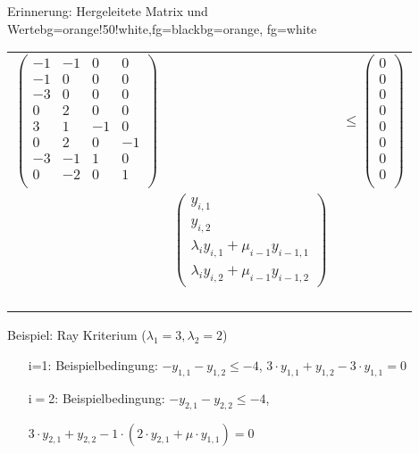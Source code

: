 \begin{frame}
	\begin{variableblock}{Erinnerung: Hergeleitete Matrix und Werte}{bg=orange!50!white,fg=black}{bg=orange, fg=white}
	\begin{tabular}{rll}
		\multirow{2}{*}{$\begin{pmatrix}
			-1 		& -1 		&  0		& 0		 \\
			-1 		& 0 		&  0		& 0		 \\
			-3 		& 0 		&  0		& 0		 \\
			0 		& 2 		&  0		& 0		 \\
			3 		& 1 		&  -1		& 0		 \\
			0 		& 2 		&  0		& -1	 \\
			-3 		& -1 		&  1		& 0		 \\
			0 		& -2 		&  0		& 1	 	 \\
			\end{pmatrix}$}& &\multirow{2}{*}{$ \le \begin{pmatrix}
			0 \\ 0 \\ 0 \\ 0 \\ 0 \\ 0 \\ 0 \\ 0 \\ 
			\end{pmatrix} $}\\
		& & \\
		& \multirow{2}{*}{$\begin{pmatrix}
			y_{i,1} \\ y_{i,2} \\ \lambda_iy_{i,1}+\mu_{i-1}y_{i-1,1} \\ \lambda_iy_{i,2}+\mu_{i-1}y_{i-1,2}
			\end{pmatrix} $} & \\
		& & \\
		& & \\
		& & \\
		& & \\
		& & \\
	\end{tabular}
	\end{variableblock}
	\vspace*{-.5em}
	\begin{exampleblock}{Beispiel: Ray Kriterium ($\lambda_1 = 3,\lambda_2 = 2$) }
		\begin{itemize}
			\setlength{\itemindent}{0.25cm}
			\item[i=1:] Beispielbedingung: $-y_{1,1}-y_{1,2} \le -4$, $3\cdot y_{1,1}+y_{1,2}-3\cdot y_{1,1}=0$
			\item[i$=$2:] Beispielbedingung: $-y_{2,1}-y_{2,2} \le -4$, 
			\item[] $3\cdot y_{2,1}+y_{2,2}-1\cdot (2\cdot y_{2,1}+\mu\cdot y_{1,1})=0$
		\end{itemize}
	\end{exampleblock}
\end{frame}




